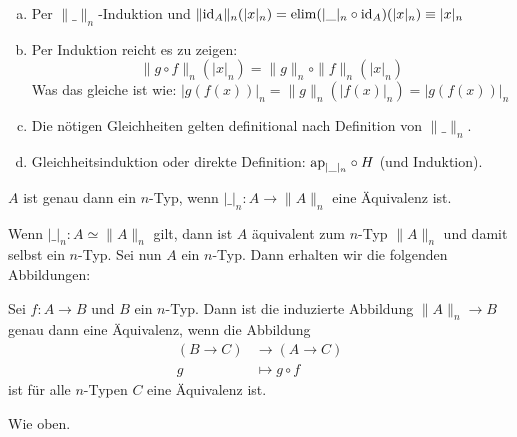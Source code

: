 \begin{beweis}
  \begin{enumerate}[(a)]
  \item Per \(\|\_\|_n\)-Induktion und \(\|\mathrm{id}_A\|_n(|x|_n)=\mathrm{elim}(|\_|_n\circ \mathrm{id}_A)(|x|_n)\equiv |x|_n\)
  \item Per Induktion reicht es zu zeigen:
    \[\|g\circ f\|_n(|x|_n)=\|g\|_n\circ \|f\|_n(|x|_n)\]
    Was das gleiche ist wie: \(|g(f(x))|_n=\|g\|_n(|f(x)|_n)=|g(f(x))|_n\)
  \item Die nötigen Gleichheiten gelten definitional nach Definition von \(\|\_\|_n\).
  \item Gleichheitsinduktion oder direkte Definition: \(\mathrm{ap}_{|\_|_n}\circ H\) (und Induktion).
  \end{enumerate}
\end{beweis}

\begin{lemma}
  \(A\) ist genau dann ein \(n\)-Typ, wenn \(|\_|_n:A\to \|A\|_n\) eine Äquivalenz ist.
\end{lemma}

\begin{beweis}
  Wenn \(|\_|_n:A\simeq \|A\|_n\) gilt, dann ist \(A\) äquivalent zum \(n\)-Typ \(\|A\|_n\) und damit selbst ein \(n\)-Typ.
  Sei nun \(A\) ein \(n\)-Typ.
  Dann erhalten wir die folgenden Abbildungen:
  \begin{center}
  \end{center}
\end{beweis}

\begin{lemma}
  \label{n-abschneidung-berechnen}
  Sei \(f:A\to B\) und \(B\) ein \(n\)-Typ. Dann ist die induzierte Abbildung \(\|A\|_n\to B\) genau dann eine Äquivalenz, wenn die Abbildung
  \begin{align*}
    (B\to C) &\to (A\to C) \\
    g&\mapsto g\circ f
  \end{align*}
  ist für alle \(n\)-Typen \(C\) eine Äquivalenz ist.
\end{lemma}

\begin{beweis}
  Wie oben.
\end{beweis}

